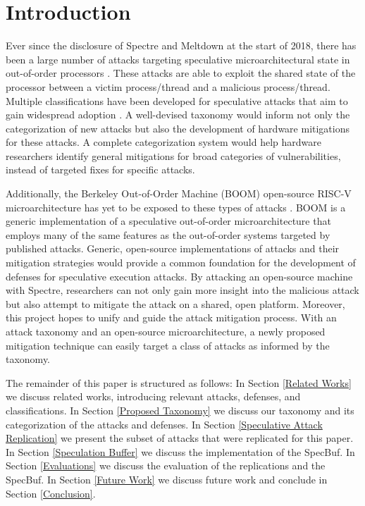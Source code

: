 \section{Introduction}

Ever since the disclosure of Spectre and Meltdown at the start of 2018, there has
been a large number of attacks targeting speculative microarchitectural state in
out-of-order processors \cite{b1,b2}. These attacks are able to exploit the shared
state of the processor between a victim process/thread and a malicious process/thread.
Multiple classifications have been developed for speculative attacks 
that aim to gain widespread adoption \cite{b5,b6,b7,b9,b10}.
A well-devised taxonomy would inform not only the 
categorization of new attacks but also the development of hardware mitigations for 
these attacks. A complete categorization system would help hardware researchers 
identify general mitigations for broad categories of vulnerabilities, instead of 
targeted fixes for specific attacks.

Additionally, the Berkeley Out-of-Order Machine (BOOM) open-source RISC-V
microarchitecture has yet to be exposed to these types of attacks \cite{b11}. BOOM
is a generic implementation of a speculative 
out-of-order microarchitecture that employs many of the same features as the 
out-of-order systems targeted by published attacks. Generic, open-source 
implementations of attacks and their mitigation strategies would provide a common 
foundation for the development of defenses for speculative execution attacks.
By attacking an open-source machine with Spectre, researchers can not only gain more 
insight into the malicious attack but also attempt to mitigate the attack on a shared,
open platform. Moreover, this project hopes to unify and guide the attack 
mitigation process. With an attack taxonomy and an open-source microarchitecture, a 
newly proposed mitigation technique can easily target a class of attacks as informed 
by the taxonomy.

The remainder of this paper is structured as follows: In Section \ref{Related Works} we discuss
related works, introducing relevant attacks, defenses, and classifications.
In Section \ref{Proposed Taxonomy} we discuss our taxonomy and its categorization of the attacks and defenses. In
Section \ref{Speculative Attack Replication} we present the subset of attacks that were replicated for this paper. In Section \ref{Speculation Buffer}
we discuss the implementation of the SpecBuf. In Section \ref{Evaluations} we discuss the evaluation of the
replications and the SpecBuf. In Section \ref{Future Work} we discuss future work and conclude in Section \ref{Conclusion}.
